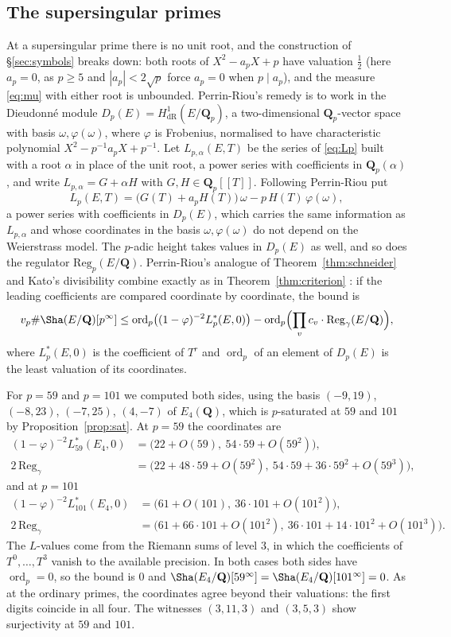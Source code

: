 \documentclass[11pt]{amsart}
\theoremstyle{definition}
\newcommand{\Q}{\mathbf{Q}}
\newcommand{\Qp}{\mathbf{Q}_p}
\newcommand{\Reg}{\mathrm{Reg}}
\newcommand{\ord}{\operatorname{ord}}
\begin{document}
\subsection{The supersingular primes}
At a supersingular prime there is no unit root, and the construction of \S\ref{sec:symbols} breaks down: both roots of $X^2-a_pX+p$ have valuation $\tfrac12$ (here $a_p=0$, as $p\ge5$ and $|a_p|<2\sqrt p$ force $a_p=0$ when $p\mid a_p$), and the measure \eqref{eq:mu} with either root is unbounded. Perrin-Riou's remedy is to work in the Dieudonn\'e module $D_p(E)=H^1_{\mathrm{dR}}(E/\Qp)$, a two-dimensional $\Qp$-vector space with basis $\omega,\varphi(\omega)$, where $\varphi$ is Frobenius, normalised to have characteristic polynomial $X^2-p^{-1}a_pX+p^{-1}$. Let $L_{p,\alpha}(E,T)$ be the series of \eqref{eq:Lp} built with a root $\alpha$ in place of the unit root, a power series with coefficients in $\Qp(\alpha)$, and write $L_{p,\alpha}=G+\alpha H$ with $G,H\in\Qp[[T]]$. Following Perrin-Riou \cite[\S3.5]{SW13} put
\[
L_p(E,T)=\bigl(G(T)+a_pH(T)\bigr)\,\omega-p\,H(T)\,\varphi(\omega),
\]
a power series with coefficients in $D_p(E)$, which carries the same information as $L_{p,\alpha}$ and whose coordinates in the basis $\omega,\varphi(\omega)$ do not depend on the Weierstrass model. The $p$-adic height takes values in $D_p(E)$ as well, and so does the regulator $\Reg_p(E/\Q)$. Perrin-Riou's analogue of Theorem~\ref{thm:schneider} and Kato's divisibility combine exactly as in Theorem~\ref{thm:criterion} \cite[Thm.~6.2 and Algorithm~11.1]{SW13}: if the leading coefficients are compared coordinate by coordinate, the bound is
\[
v_p\#\Sha(E/\Q)[p^\infty]\le\ord_p\bigl((1-\varphi)^{-2}L_p^*(E,0)\bigr)-\ord_p\Bigl(\prod_vc_v\cdot\Reg_\gamma(E/\Q)\Bigr),
\]
where $L_p^*(E,0)$ is the coefficient of $T^r$ and $\ord_p$ of an element of $D_p(E)$ is the least valuation of its coordinates.

For $p=59$ and $p=101$ we computed both sides, using the basis $(-9,19)$, $(-8,23)$, $(-7,25)$, $(4,-7)$ of $E_4(\Q)$, which is $p$-saturated at $59$ and $101$ by Proposition~\ref{prop:sat}. At $p=59$ the coordinates are
\begin{align*}
(1-\varphi)^{-2}L_{59}^*(E_4,0)&=\bigl(22+O(59),\ 54\cdot59+O(59^2)\bigr),\\
2\,\Reg_\gamma&=\bigl(22+48\cdot59+O(59^2),\ 54\cdot59+36\cdot59^2+O(59^3)\bigr),
\end{align*}
and at $p=101$
\begin{align*}
(1-\varphi)^{-2}L_{101}^*(E_4,0)&=\bigl(61+O(101),\ 36\cdot101+O(101^2)\bigr),\\
2\,\Reg_\gamma&=\bigl(61+66\cdot101+O(101^2),\ 36\cdot101+14\cdot101^2+O(101^3)\bigr).
\end{align*}
The $L$-values come from the Riemann sums of level $3$, in which the coefficients of $T^0,\dots,T^3$ vanish to the available precision. In both cases both sides have $\ord_p=0$, so the bound is $0$ and $\Sha(E_4/\Q)[59^\infty]=\Sha(E_4/\Q)[101^\infty]=0$. As at the ordinary primes, the coordinates agree beyond their valuations: the first digits coincide in all four. The witnesses $(3,11,3)$ and $(3,5,3)$ show surjectivity at $59$ and $101$.
\end{document}
